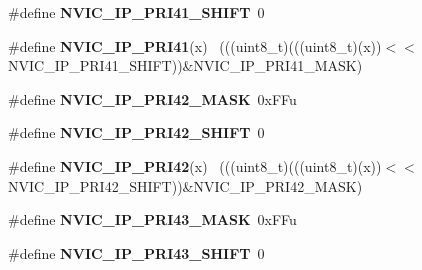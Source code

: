 \begin{DoxyCompactItemize}
\item 
\hypertarget{group___n_v_i_c___register___masks_gaa18ee9b6dd42d28ef87e6f4b71002051}{}\#define {\bfseries N\+V\+I\+C\+\_\+\+I\+P\+\_\+\+P\+R\+I41\+\_\+\+S\+H\+I\+F\+T}~0\label{group___n_v_i_c___register___masks_gaa18ee9b6dd42d28ef87e6f4b71002051}

\item 
\hypertarget{group___n_v_i_c___register___masks_gab285d460669275058e3b49b0e1fe4089}{}\#define {\bfseries N\+V\+I\+C\+\_\+\+I\+P\+\_\+\+P\+R\+I41}(x)                                              ~(((uint8\+\_\+t)(((uint8\+\_\+t)(x))$<$$<$N\+V\+I\+C\+\_\+\+I\+P\+\_\+\+P\+R\+I41\+\_\+\+S\+H\+I\+F\+T))\&N\+V\+I\+C\+\_\+\+I\+P\+\_\+\+P\+R\+I41\+\_\+\+M\+A\+S\+K)\label{group___n_v_i_c___register___masks_gab285d460669275058e3b49b0e1fe4089}

\item 
\hypertarget{group___n_v_i_c___register___masks_ga4a21fa2fcc875070f287c906d2327308}{}\#define {\bfseries N\+V\+I\+C\+\_\+\+I\+P\+\_\+\+P\+R\+I42\+\_\+\+M\+A\+S\+K}~0x\+F\+Fu\label{group___n_v_i_c___register___masks_ga4a21fa2fcc875070f287c906d2327308}

\item 
\hypertarget{group___n_v_i_c___register___masks_ga367f1a67cd0eb037c12ac51695e41ab6}{}\#define {\bfseries N\+V\+I\+C\+\_\+\+I\+P\+\_\+\+P\+R\+I42\+\_\+\+S\+H\+I\+F\+T}~0\label{group___n_v_i_c___register___masks_ga367f1a67cd0eb037c12ac51695e41ab6}

\item 
\hypertarget{group___n_v_i_c___register___masks_ga57e51eda38f43519acb72dba5b682d54}{}\#define {\bfseries N\+V\+I\+C\+\_\+\+I\+P\+\_\+\+P\+R\+I42}(x)                                              ~(((uint8\+\_\+t)(((uint8\+\_\+t)(x))$<$$<$N\+V\+I\+C\+\_\+\+I\+P\+\_\+\+P\+R\+I42\+\_\+\+S\+H\+I\+F\+T))\&N\+V\+I\+C\+\_\+\+I\+P\+\_\+\+P\+R\+I42\+\_\+\+M\+A\+S\+K)\label{group___n_v_i_c___register___masks_ga57e51eda38f43519acb72dba5b682d54}

\item 
\hypertarget{group___n_v_i_c___register___masks_ga98865f2a8529f1610eeb0ed2321f7115}{}\#define {\bfseries N\+V\+I\+C\+\_\+\+I\+P\+\_\+\+P\+R\+I43\+\_\+\+M\+A\+S\+K}~0x\+F\+Fu\label{group___n_v_i_c___register___masks_ga98865f2a8529f1610eeb0ed2321f7115}

\item 
\hypertarget{group___n_v_i_c___register___masks_ga740cf79c3a0217978c5fb0d9bf4f7928}{}\#define {\bfseries N\+V\+I\+C\+\_\+\+I\+P\+\_\+\+P\+R\+I43\+\_\+\+S\+H\+I\+F\+T}~0\label{group___n_v_i_c___register___masks_ga740cf79c3a0217978c5fb0d9bf4f7928}


\end{DoxyCompactItemize}
